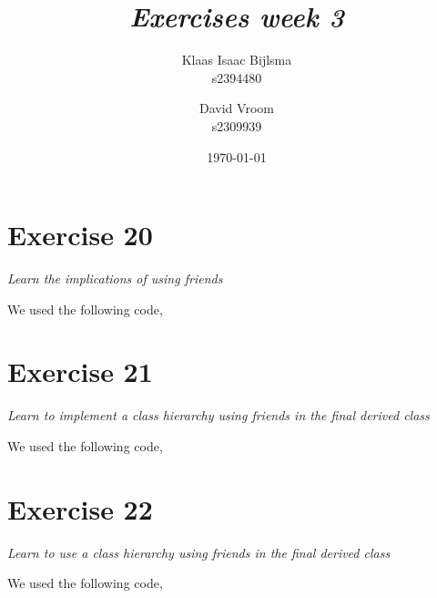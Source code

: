 \documentclass[12pt]{article}
\title{\itshape Exercises week 3}
\author{
	Klaas Isaac Bijlsma \\ s2394480
	\and
	David Vroom \\ s2309939
}
\date{\today}
\newcommand{\desc}[1]{\textit{#1} \vspace{1em}}
\begin{document}
\maketitle

\section*{Exercise 20}
\desc{Learn the implications of using friends}

We used the following code,





\clearpage

\section*{Exercise 21}
\desc{Learn to implement a class hierarchy using friends in the final derived class}

We used the following code,












\clearpage

\section*{Exercise 22}
\desc{Learn to use a class hierarchy using friends in the final derived class}

We used the following code,





\end{document}
